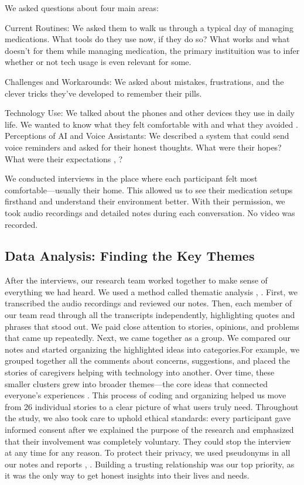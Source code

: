 \documentclass[acmlarge]{acmart}
\begin{document}
We asked questions about four main areas:~

Current Routines: We asked them to walk us through a typical day of
managing medications. What tools do they use now, if they do so? What
works and what doesn't for them while managing medication, the primary
instituition was to infer whether or not tech usage is even relevant for
some.~

Challenges and Workarounds: We asked about mistakes, frustrations, and
the clever tricks they've developed to remember their pills.~

Technology Use: We talked about the phones and other devices they use in
daily life. We wanted to know what they felt comfortable with and what
they avoided \cite{10.1145/3712275}. Perceptions of AI and Voice Assistants: We
described a system that could send voice reminders and asked for their
honest thoughts. What were their hopes? What were their expectations
\cite{10.1145/3623809.3623827}, \cite{10.1145/3706598.3713578}?~

We conducted interviews in the place where each participant felt most
comfortable---usually their home. This allowed us to see their
medication setups firsthand and understand their environment better.
With their permission, we took audio recordings and detailed notes
during each conversation. No video was recorded.

\subsection{Data Analysis: Finding the Key Themes~}
After the interviews, our research team worked together to make sense of
everything we had heard. We used a method called thematic analysis
\cite{info:doi/10.2196/65776}, \cite{10.1145/3546743}. First, we transcribed the audio recordings and reviewed
our notes. Then, each member of our team read through all the
transcripts independently, highlighting quotes and phrases that stood
out. We paid close attention to stories, opinions, and problems that
came up repeatedly. Next, we came together as a group. We compared our
notes and started organizing the highlighted ideas into categories.For example, we grouped together all the comments about concerns, suggestions, and placed the stories of caregivers helping with technology into another. Over time, these smaller clusters grew into broader themes—the core ideas that connected everyone’s experiences \cite{Bastani01122021}. This process of coding and organizing helped us move from 26 individual stories to a clear picture of what users truly need. Throughout the study, we also took care to uphold ethical standards: every participant gave informed consent after we explained the purpose of the research and emphasized that their involvement was completely voluntary.
 They could stop the
interview at any time for any reason. To protect their privacy, we used
pseudonyms in all our notes and reports \cite{Ahmad2022}, \cite{info:doi/10.2196/66778}. Building a trusting
relationship was our top priority, as it was the only way to get honest
insights into their lives and needs.
\end{document}
